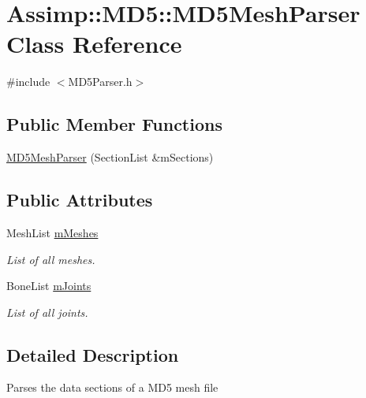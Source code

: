 \hypertarget{class_assimp_1_1_m_d5_1_1_m_d5_mesh_parser}{\section{Assimp\+:\+:M\+D5\+:\+:M\+D5\+Mesh\+Parser Class Reference}
\label{class_assimp_1_1_m_d5_1_1_m_d5_mesh_parser}
}


{\ttfamily \#include $<$M\+D5\+Parser.\+h$>$}

\subsection*{Public Member Functions}
\begin{DoxyCompactItemize}
\item 
\hyperlink{class_assimp_1_1_m_d5_1_1_m_d5_mesh_parser_a657163f4028d8a806f8cab6d54799869}{M\+D5\+Mesh\+Parser} (Section\+List \&m\+Sections)
\end{DoxyCompactItemize}
\subsection*{Public Attributes}
\begin{DoxyCompactItemize}
\item 
\hypertarget{class_assimp_1_1_m_d5_1_1_m_d5_mesh_parser_acd0f43e3f6721678fe9529fff2041efc}{Mesh\+List \hyperlink{class_assimp_1_1_m_d5_1_1_m_d5_mesh_parser_acd0f43e3f6721678fe9529fff2041efc}{m\+Meshes}}\label{class_assimp_1_1_m_d5_1_1_m_d5_mesh_parser_acd0f43e3f6721678fe9529fff2041efc}

\begin{DoxyCompactList}\small\item\em List of all meshes. \end{DoxyCompactList}\item 
\hypertarget{class_assimp_1_1_m_d5_1_1_m_d5_mesh_parser_a7f1e183cf52ad6d2ae0fc06ae4338948}{Bone\+List \hyperlink{class_assimp_1_1_m_d5_1_1_m_d5_mesh_parser_a7f1e183cf52ad6d2ae0fc06ae4338948}{m\+Joints}}\label{class_assimp_1_1_m_d5_1_1_m_d5_mesh_parser_a7f1e183cf52ad6d2ae0fc06ae4338948}

\begin{DoxyCompactList}\small\item\em List of all joints. \end{DoxyCompactList}\end{DoxyCompactItemize}


\subsection{Detailed Description}
Parses the data sections of a M\+D5 mesh file 

